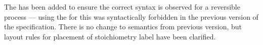 The  has been added to ensure the correct syntax
is observed for a reversible process --- using the  for this was syntactically forbidden in the previous version of
the specification. There is no change to semantics from previous
version, but layout rules for placement of stoichiometry label have
been clarified.












